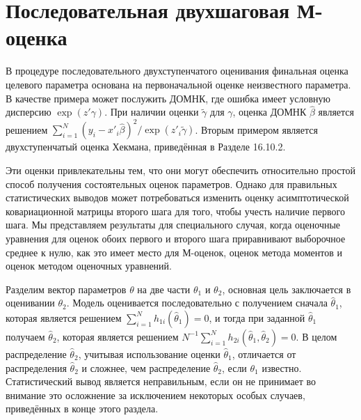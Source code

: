 \section{Последовательная двухшаговая М-оценка}

В процедуре последовательного двухступенчатого оценивания финальная оценка целевого параметра основана на первоначальной оценке неизвестного параметра. В качестве примера может послужить ДОМНК, где ошибка имеет условную дисперсию $\exp(z'\gamma)$. При наличии оценки $\tilde{\gamma}$ для $\gamma$, оценка ДОМНК $\hat{\beta}$ является решением $\sum_{i=1}^{N}(y_i-x'_i\hat{\beta})^2/\exp(z'_i \tilde{\gamma})$. Вторым примером является двухступенчатый оценка Хекмана, приведённая в Разделе 16.10.2.

Эти оценки привлекательны тем, что они могут обеспечить относительно простой способ получения состоятельных оценок параметров. Однако для правильных статистических выводов может потребоваться изменить оценку асимптотической ковариационной матрицы второго шага для того, чтобы учесть наличие первого шага. Мы представляем результаты для специального случая, когда оценочные уравнения для оценок обоих первого и второго шага приравнивают выборочное среднее к нулю, как это имеет место для М-оценок, оценок метода моментов и оценок методом оценочных уравнений.

Разделим вектор параметров $\theta$ на две части $\theta_1$ и $\theta_2$, основная цель заключается в оценивании $\theta_2$. Модель оценивается последовательно с получением сначала $\hat{\theta}_1$, которая является решением $\sum_{i=1}^{N} h_{1i}(\hat{\theta}_1)=0$, и тогда при заданной $\hat{\theta}_1$ получаем $\hat{\theta}_2$, которая является решением $N^{-1} \sum_{i=1}^{N} h_{2i}(\hat{\theta}_1,\hat{\theta}_2)=0$. В целом распределение $\hat{\theta}_2$, учитывая использование оценки $\hat{\theta}_1$, отличается от распределения $\hat{\theta}_2$ и сложнее, чем распределение $\hat{\theta}_2$, если $\theta_1$ известно. Статистический вывод является неправильным, если он не принимает во внимание это осложнение за исключением некоторых особых случаев, приведённых в конце этого раздела.

